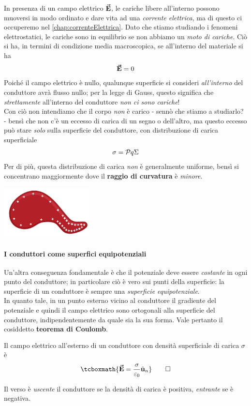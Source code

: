 In presenza di un campo elettrico $\vb*{\va{E}}$, le cariche libere all'interno possono muoversi in modo ordinato e dare vita ad una \textit{corrente elettrica}, ma di questo ci occuperemo nel \autoref{chap:correnteElettrica}. Dato che stiamo studiando i fenomeni elettrostatici, le cariche sono in equilibrio se non abbiamo un \textit{moto di cariche}. Ciò si ha, in termini di condizione media macroscopica, se all'interno del materiale si ha
\begin{equation}
	\vb*{\va{E}}=0
\end{equation}
Poiché il campo elettrico è nullo, qualunque superficie si consideri \textit{all'interno} del conduttore avrà flusso nullo; per la legge di Gauss, questo significa che \textit{strettamente} all'interno del conduttore \textit{non ci sono cariche}!\\
Con ciò non intendiamo che il corpo \textit{non} è carico - sennò che stiamo a studiarlo? - bensì che non c'è un eccesso di carica di un segno o dell'altro, ma questo eccesso può stare \textit{solo} sulla superficie del conduttore, con distribuzione di carica superficiale
	\begin{equation*}
		\sigma=\pv{q}{\Sigma}
	\end{equation*}
	Per di più, questa distribuzione di carica \textit{non} è generalmente uniforme, bensì si concentrano maggiormente dove il \textbf{raggio di curvatura} è \textit{minore}.
	\begin{center}
		\includegraphics[width=0.35\textwidth]{images/chp4pipo.pdf}
	\end{center}
\paragraph{I conduttori come superfici equipotenziali}
Un'altra conseguenza fondamentale è che il potenziale deve essere \textit{costante} in ogni punto del conduttore; in particolare ciò è vero sui punti della superficie: la superficie di un conduttore è sempre una \textit{superficie equipotenziale}.\\
In quanto tale, in un punto esterno vicino al conduttore il gradiente del potenziale e quindi il campo elettrico sono ortogonali alla superficie del conduttore, indipendentemente da quale sia la sua forma. Vale pertanto il cosiddetto \textbf{teorema di Coulomb}.
	\begin{theoremaqed}
		Il campo elettrico all'esterno di un conduttore con densità superficiale di carica $\sigma$ è
		\begin{equation}
			\tcboxmath{\vba{E}=\frac{\sigma}{\epsilon_0}\vbh{u}_n}\qedhere
		\end{equation}
	\end{theoremaqed}
	Il verso è \textit{uscente} il conduttore se la densità di carica è positiva, \textit{entrante} se è negativa.
